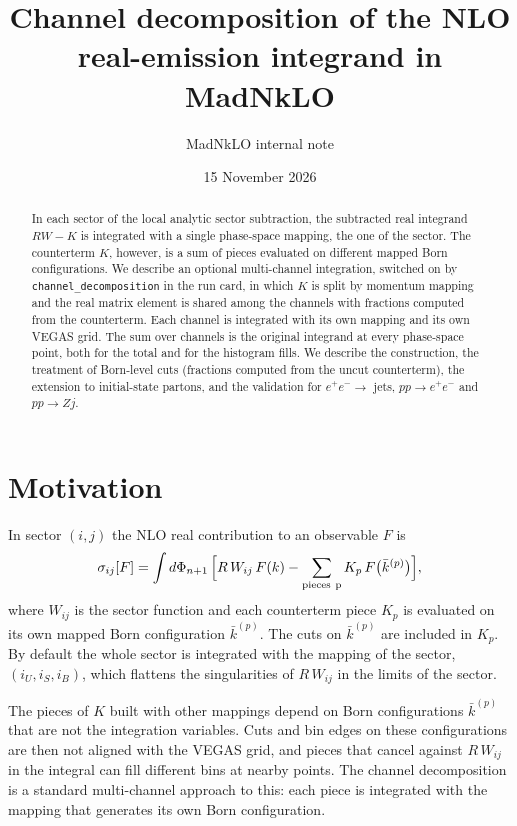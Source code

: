 \documentclass[11pt,a4paper]{article}
\title{Channel decomposition of the NLO real-emission integrand in MadNkLO}
\author{MadNkLO internal note}
\date{15 November 2026}
\newcommand{\kb}{\bar k}
\begin{document}
\maketitle

\begin{abstract}
In each sector of the local analytic sector subtraction, the subtracted real
integrand $RW-K$ is integrated with a single phase-space mapping, the one of
the sector. The counterterm $K$, however, is a sum of pieces evaluated on
different mapped Born configurations. We describe an optional multi-channel
integration, switched on by \texttt{channel\_decomposition} in the run card,
in which $K$ is split by momentum mapping and the real matrix element is
shared among the channels with fractions computed from the counterterm. Each
channel is integrated with its own mapping and its own VEGAS grid. The sum over
channels is the original integrand at every phase-space point, both for the
total and for the histogram fills. We describe the construction, the
treatment of Born-level cuts (fractions computed from the uncut counterterm),
the extension to initial-state partons, and the validation for $e^+e^-\to$
jets, $pp\to e^+e^-$ and $pp\to Zj$.
\end{abstract}

\section{Motivation}

In sector $(i,j)$ the NLO real contribution to an observable $F$ is
\begin{equation}
  \sigma_{ij}[F] = \int d\Phi_{n+1}\,
  \Big[ R\,W_{ij}\,F(k) - \sum_{\rm pieces\ p} K_p\,F\big(\kb^{(p)}\big)\Big],
  \label{eq:sector}
\end{equation}
where $W_{ij}$ is the sector function and each counterterm piece $K_p$ is
evaluated on its own mapped Born configuration $\kb^{(p)}$. The cuts on
$\kb^{(p)}$ are included in $K_p$. By default the whole sector is integrated
with the mapping of the sector, $(i_U,i_S,i_B)$, which flattens the
singularities of $R\,W_{ij}$ in the limits of the sector.

The pieces of $K$ built with other mappings depend on Born configurations
$\kb^{(p)}$ that are not the integration variables. Cuts and bin edges on
these configurations are then not aligned with the VEGAS grid, and pieces
that cancel against $R\,W_{ij}$ in the integral can fill different bins at
nearby points. The channel decomposition is a standard multi-channel approach to this: each
piece is integrated with the mapping that generates its own Born
configuration.
\end{document}
